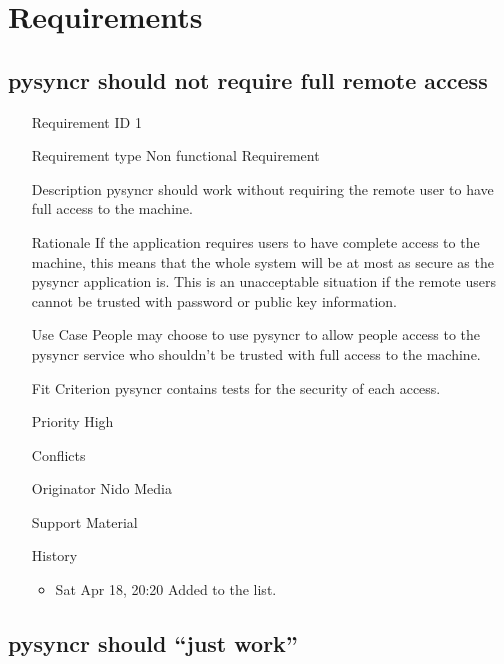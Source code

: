\documentclass{article}
\begin{document}
\section{Requirements}

\subsection{pysyncr should not require full remote access}

\begin{itemize}
  \item[Requirement ID] 1
  \item[Requirement type] Non functional Requirement
  \item[Description] pysyncr should work without requiring the
  remote user to have full access to the machine.
  \item[Rationale] If the application requires users to have
  complete access to the machine, this means that the whole system
  will be at most as secure as the pysyncr application is. This is
  an unacceptable situation if the remote users cannot be trusted
  with password or public key information.
  \item[Use Case] People may choose to use pysyncr to allow people
  access to the pysyncr service who shouldn't be trusted with full
  access to the machine.
  \item[Fit Criterion] pysyncr contains tests for the security of
  each access.
  \item[Priority] High
  \item[Conflicts]
  \item[Originator] Nido Media
  \item[Support Material]
  \item[History]
  \begin{itemize}
    \item Sat Apr 18, 20:20 Added to the list.
  \end{itemize}
\end{itemize}

\subsection{pysyncr should ``just work''}
\end{document}
